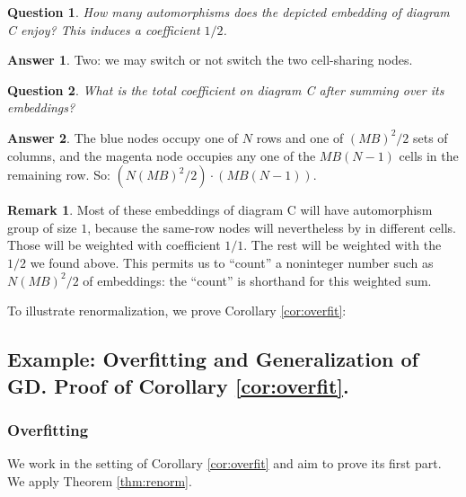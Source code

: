 \documentclass{article}
\theoremstyle{plain}
\newtheorem*{quest*}{Question}
\theoremstyle{definition}
\newtheorem*{answ*}{Answer}
\newtheorem*{rmk*}{Remark}
\begin{document}
            \begin{quest*}
                How many automorphisms does the depicted embedding of diagram C
                enjoy?
                This induces a coefficient $1/2$.
            \end{quest*}
            \begin{answ*}
                Two: we may switch or not switch the two cell-sharing nodes.
            \end{answ*}
            \begin{quest*}
                What is the total coefficient on diagram C after summing
                over its embeddings?
            \end{quest*}
            \begin{answ*}
                The blue nodes occupy one of $N$ rows and one of $(MB)^2/2$  
                sets of columns, and the magenta node occupies any one of the
                $MB(N-1)$ cells in the remaining row.  So:
                $(N(MB)^2/2) \cdot (MB(N-1))$.
            \end{answ*}
            \begin{rmk*}
                Most of these embeddings of diagram C will have automorphism
                group of size $1$, because the same-row nodes will nevertheless
                by in different cells.  Those will be weighted with coefficient
                $1/1$.  The rest will be weighted with the $1/2$ we found
                above.  This permits us to ``count'' a noninteger number such
                as $N(MB)^2/2$ of embeddings: the ``count'' is shorthand for
                this weighted sum.
            \end{rmk*}

            To illustrate renormalization, we prove Corollary
            \ref{cor:overfit}:

    \subsection{
        Example: Overfitting and Generalization of GD.  Proof of Corollary
        \ref{cor:overfit}. 
    }
        \subsubsection*{Overfitting}
            We work in the setting of Corollary \ref{cor:overfit} and aim to
            prove its first part.  We apply Theorem \ref{thm:renorm}.  
\end{document}
